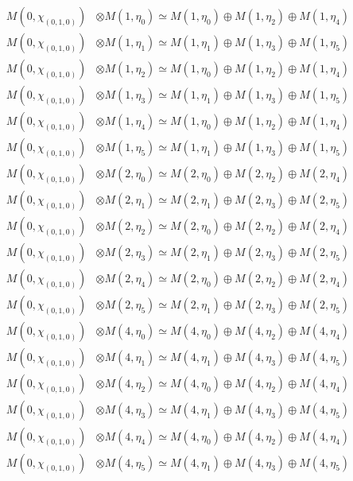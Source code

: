 \begin{align*}
M(0,\chi_{(0,1,0)}) &\otimes M(1,\eta_{0}) \simeq M(1,\eta_{0}) \oplus M(1,\eta_{2}) \oplus M(1,\eta_{4}) \\
M(0,\chi_{(0,1,0)}) &\otimes M(1,\eta_{1}) \simeq M(1,\eta_{1}) \oplus M(1,\eta_{3}) \oplus M(1,\eta_{5}) \\
M(0,\chi_{(0,1,0)}) &\otimes M(1,\eta_{2}) \simeq M(1,\eta_{0}) \oplus M(1,\eta_{2}) \oplus M(1,\eta_{4}) \\
M(0,\chi_{(0,1,0)}) &\otimes M(1,\eta_{3}) \simeq M(1,\eta_{1}) \oplus M(1,\eta_{3}) \oplus M(1,\eta_{5}) \\
M(0,\chi_{(0,1,0)}) &\otimes M(1,\eta_{4}) \simeq M(1,\eta_{0}) \oplus M(1,\eta_{2}) \oplus M(1,\eta_{4}) \\
M(0,\chi_{(0,1,0)}) &\otimes M(1,\eta_{5}) \simeq M(1,\eta_{1}) \oplus M(1,\eta_{3}) \oplus M(1,\eta_{5}) \\
M(0,\chi_{(0,1,0)}) &\otimes M(2,\eta_{0}) \simeq M(2,\eta_{0}) \oplus M(2,\eta_{2}) \oplus M(2,\eta_{4}) \\
M(0,\chi_{(0,1,0)}) &\otimes M(2,\eta_{1}) \simeq M(2,\eta_{1}) \oplus M(2,\eta_{3}) \oplus M(2,\eta_{5}) \\
M(0,\chi_{(0,1,0)}) &\otimes M(2,\eta_{2}) \simeq M(2,\eta_{0}) \oplus M(2,\eta_{2}) \oplus M(2,\eta_{4}) \\
M(0,\chi_{(0,1,0)}) &\otimes M(2,\eta_{3}) \simeq M(2,\eta_{1}) \oplus M(2,\eta_{3}) \oplus M(2,\eta_{5}) \\
M(0,\chi_{(0,1,0)}) &\otimes M(2,\eta_{4}) \simeq M(2,\eta_{0}) \oplus M(2,\eta_{2}) \oplus M(2,\eta_{4}) \\
M(0,\chi_{(0,1,0)}) &\otimes M(2,\eta_{5}) \simeq M(2,\eta_{1}) \oplus M(2,\eta_{3}) \oplus M(2,\eta_{5}) \\
M(0,\chi_{(0,1,0)}) &\otimes M(4,\eta_{0}) \simeq M(4,\eta_{0}) \oplus M(4,\eta_{2}) \oplus M(4,\eta_{4}) \\
M(0,\chi_{(0,1,0)}) &\otimes M(4,\eta_{1}) \simeq M(4,\eta_{1}) \oplus M(4,\eta_{3}) \oplus M(4,\eta_{5}) \\
M(0,\chi_{(0,1,0)}) &\otimes M(4,\eta_{2}) \simeq M(4,\eta_{0}) \oplus M(4,\eta_{2}) \oplus M(4,\eta_{4}) \\
M(0,\chi_{(0,1,0)}) &\otimes M(4,\eta_{3}) \simeq M(4,\eta_{1}) \oplus M(4,\eta_{3}) \oplus M(4,\eta_{5}) \\
M(0,\chi_{(0,1,0)}) &\otimes M(4,\eta_{4}) \simeq M(4,\eta_{0}) \oplus M(4,\eta_{2}) \oplus M(4,\eta_{4}) \\
M(0,\chi_{(0,1,0)}) &\otimes M(4,\eta_{5}) \simeq M(4,\eta_{1}) \oplus M(4,\eta_{3}) \oplus M(4,\eta_{5}) \\

\end{align*}
